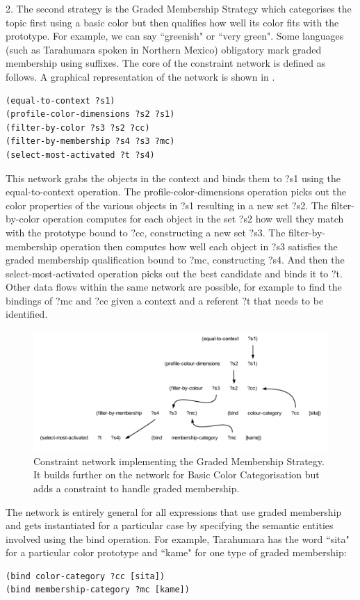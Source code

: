 2. The second strategy is the {\bfshape Graded Membership Strategy} which categorises the topic first using 
a basic color but then qualifies how well its color fits with the prototype. For example, we can say ``greenish" or
``very green". Some languages (such as Tarahumara spoken in Northern Mexico) obligatory mark graded membership using 
suffixes. The core of the constraint network is defined as follows. A graphical representation of the network is shown
in . 
\begin{verbatim}
(equal-to-context ?s1) 
(profile-color-dimensions ?s2 ?s1)
(filter-by-color ?s3 ?s2 ?cc)
(filter-by-membership ?s4 ?s3 ?mc)
(select-most-activated ?t ?s4)
\end{verbatim}
This network grabs the objects in the context and binds them to ?s1 using the equal-to-context operation. 
The profile-color-dimensions operation picks out the color properties of the various objects in ?s1 resulting in 
a new set ?s2. The filter-by-color operation computes for each object in the set ?s2
how well they match with the prototype bound to ?cc, constructing a new set ?s3. The filter-by-membership operation 
then computes how well 
each object in ?s3 satisfies the graded membership qualification bound to ?mc, 
constructing ?s4. And then the select-most-activated operation picks out the best candidate and binds it to ?t. 
Other data flows within the same network are possible, for example to find the bindings of ?mc and ?cc given 
a context and a referent ?t that needs to be identified. 

\begin{figure}[htbp]
  \centerline{\includegraphics[width=1.0\textwidth]{chap11/figs/graded}}
\caption{\label{fig:graded} 
Constraint network implementing the Graded Membership Strategy. It builds further on the network for Basic Color
Categorisation but adds a constraint to handle graded membership. }
\end{figure}

The network is entirely general for all expressions that use graded membership and gets instantiated for a particular 
case by specifying the semantic entities involved using the bind operation. For example, Tarahumara has the word 
``sita" for a particular color prototype and ``kame" for one type of graded membership: 
\begin{verbatim}
(bind color-category ?cc [sita])
(bind membership-category ?mc [kame]) 
\end{verbatim}

